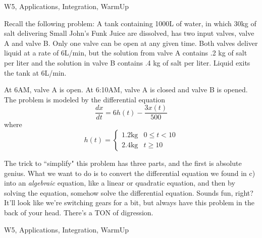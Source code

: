 \begin{tagblock}{W5, Applications, Integration, WarmUp}
\begin{question}
	
Recall the following problem: A tank containing 1000L of water, in which 30kg of salt delivering Small John's Funk Juice are dissolved, has two input valves, valve A and valve B. Only one valve can be open at any given time. Both valves deliver liquid at a rate of 6L/min, but the solution from valve A contains .2 kg of salt per liter and the solution in valve B contains .4 kg of salt per liter. Liquid exits the tank at 6L/min.

At 6AM, valve A is open. At 6:10AM, valve A is closed and valve B is opened. The problem is modeled by the differential equation
\begin{equation}\label{brine}
\frac{dx}{dt}=6h(t)-\frac{3x(t)}{500}
\end{equation}
where
\[
h(t)=\begin{cases} 1.2\textrm{kg} & 0\leq t<10 \\ 2.4\textrm{kg} & t\geq 10 \end{cases}
\]


\bigskip

The trick to ``simplify" this problem has three parts, and the first is absolute genius. What we want to do is to convert the differential equation we found in c) into an \textit{algebraic} equation, like a linear or quadratic equation, and then by solving the equation, somehow solve the differential equation. Sounds fun, right? It'll look like we're switching gears for a bit, but always have this problem in the back of your head. There's a TON of digression. 

    
\begin{tags}
        W5, Applications, Integration, WarmUp
\end{tags}
    
\begin{diary}
\end{diary}
	
\begin{solution}

\end{solution}
	
\end{question}

\end{tagblock}

